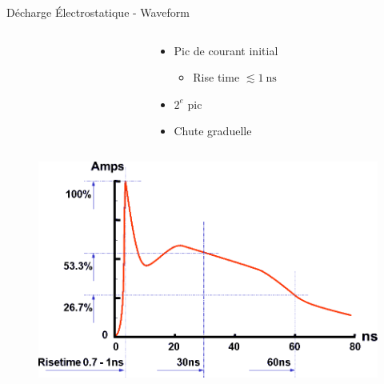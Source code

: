\begin{frame}{Décharge Électrostatique - Waveform}
    \begin{columns}
        \begin{column}{0.5\textwidth}
        \end{column}
        \begin{column}{0.5\textwidth}
            \begin{itemize}
                \item Pic de courant initial
                \begin{itemize}
                    \item Rise time $\lesssim \SI{1}{\nano\second}$
                \end{itemize}
                \item $2^e$ pic
                \item Chute graduelle
            \end{itemize}
        \end{column}
    \end{columns}

    \vspace{-66pt}

    \begin{figure}
        \centering
        \includegraphics[width=\textwidth, height=0.8\textheight, keepaspectratio]{pictures/ESD-discharge-waveform.png}
    \end{figure}
\end{frame}

